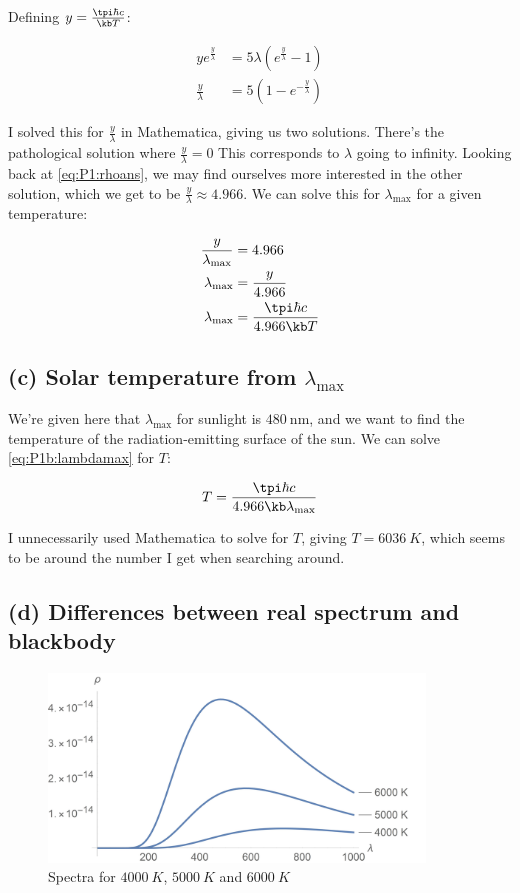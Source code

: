 \documentclass[../../PS3.tex]{subfiles}
\begin{document}
Defining $y = \frac{\tpi \hbar c }{\kb T }$:

\begin{align}
	y e^{ \frac{y}{ \lambda}}  &= 5 \lambda \left(e^{ \frac{y}{\lambda}} - 1\right) \\
	\frac{y}{\lambda} &=  5 \left(1 - e^{-  \frac{y}{\lambda}}\right) 
\end{align}

I solved this for $\frac{y}{\lambda}$ in Mathematica, giving us two solutions. There's the pathological solution where $\frac{y}{\lambda} = 0$ This corresponds to $\lambda$ going to infinity. Looking back at \eqref{eq:P1:rhoans}, we may find ourselves more interested in the other solution, which we get to be $\frac{y}{\lambda} \approx 4.966$. We can solve this for $\lambda_{\mathrm{max}}$ for a given temperature:

\begin{align}
	\frac{y}{\lambda_{\mathrm{max}}} &= 4.966 \\
	\lambda_{\mathrm{max}} &= \frac{y}{4.966} \\
	\lambda_{\mathrm{max}} &= \frac{\tpi \hbar c }{4.966 \kb T } \label{eq:P1b:lambdamax}
\end{align}

\subsection*{(c) Solar temperature from $\lambda_\mathrm{max}$}

We're given here that $\lambda_\mathrm{max}$ for sunlight is $\SI{480}{\nano\meter}$, and we want to find the temperature of the radiation-emitting surface of the sun. We can solve \eqref{eq:P1b:lambdamax} for $T$: 

\begin{equation}
	T = \frac{\tpi \hbar c }{4.966 \kb \lambda_{\mathrm{max}} }
\end{equation}

I unnecessarily used Mathematica to solve for $T$, giving $T = \SI{6036}{K}$, which seems to be around the number I get when searching around.

\subsection*{(d) Differences between real spectrum and blackbody}


\begin{figure}[htp]
	\centering
	\includegraphics[width=10cm]{4000And6000Spectrum}
	\caption{Spectra for $\SI{4000}{K}$, $\SI{5000}{K}$ and $\SI{6000}{K}$}\label{fig:Prob1:4000And6000Spectrum}
\end{figure}
\end{document}

